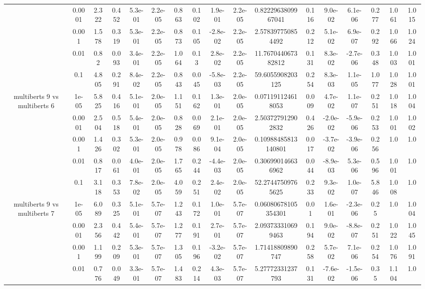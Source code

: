 \begin{tabular}{|c|c|c|c|c|c|c|c|c|c|c|c|c|c|c|c|c|}
 & 0.0001 & 2.322 & 0.452 & 5.3e-01 & 2.2e-05 & 0.863 & 0.102 & 1.9e-01 & 2.2e-05 & 0.8222963809967041 & 0.116 & 9.0e-02 & 6.1e-06 & 0.277 & 1.061 & 1.015 \\
 & 0.001 & 1.578 & 0.319 & 5.3e-01 & 2.2e-05 & 0.873 & 0.105 & -2.8e-02 & 2.2e-05 & 2.578397750854492 & 0.212 & 5.1e-02 & 6.9e-07 & 0.292 & 1.066 & 1.024 \\
 & 0.01 & 0.82 & 0.093 & 3.4e-01 & 2.2e-05 & 1.064 & 0.13 & 2.8e-02 & 2.2e-05 & 11.767044067382812 & 0.131 & 8.3e-02 & -2.7e-06 & 0.348 & 1.003 & 1.001 \\
 & 0.1 & 4.805 & 0.291 & 8.4e-02 & 2.2e-05 & 0.843 & 0.045 & -5.8e-03 & 2.2e-05 & 59.6055908203125 & 0.254 & 8.3e-03 & 1.1e-05 & 1.077 & 1.028 & 1.001 \\
\hline
\multirow{5}{*}{multiberts 9 vs multiberts 6} & 1e-05 & 5.825 & 0.416 & 5.1e-01 & 2.0e-05 & 1.151 & 0.162 & 1.3e-01 & 2.0e-05 & 0.071191124618053 & 0.009 & 4.7e-02 & 1.1e-07 & 0.251 & 1.018 & 1.004 \\
 & 0.0001 & 2.504 & 0.518 & 5.4e-01 & 2.0e-05 & 0.828 & 0.069 & 2.1e-01 & 2.0e-05 & 2.503727912902832 & 0.426 & -2.0e-02 & -5.9e-06 & 0.253 & 1.001 & 1.002 \\
 & 0.001 & 1.426 & 0.302 & 5.3e-01 & 2.0e-05 & 0.978 & 0.086 & 9.1e-04 & 2.0e-05 & 0.10988485813140801 & 0.017 & -3.7e-02 & -3.9e-06 & 0.256 & 1.0 & 1.0 \\
 & 0.01 & 0.817 & 0.061 & 4.0e-01 & 2.0e-05 & 1.765 & 0.244 & -4.4e-03 & 2.0e-05 & 0.306990146636962 & 0.044 & -8.9e-03 & 5.3e-06 & 0.596 & 1.001 & 1.0 \\
 & 0.1 & 3.118 & 0.353 & 7.8e-02 & 2.0e-05 & 4.059 & 0.251 & 2.4e-02 & 2.0e-05 & 52.27447509765625 & 0.233 & 9.3e-02 & 1.0e-07 & 5.846 & 1.008 & 1.0 \\
\hline
\multirow{5}{*}{multiberts 9 vs multiberts 7} & 1e-05 & 6.089 & 0.325 & 5.1e-01 & 5.7e-07 & 1.243 & 0.172 & 1.0e-01 & 5.7e-07 & 0.06080678105354301 & 0.01 & 1.6e-01 & -2.3e-06 & 0.25 & 1.0 & 1.004 \\
 & 0.0001 & 2.356 & 0.442 & 5.4e-01 & 5.7e-07 & 1.277 & 0.191 & 2.7e-01 & 5.7e-07 & 2.093733310699463 & 0.194 & 9.0e-02 & -8.8e-07 & 0.251 & 1.022 & 1.045 \\
 & 0.001 & 1.199 & 0.209 & 5.3e-01 & 5.7e-07 & 1.305 & 0.196 & -3.2e-02 & 5.7e-07 & 1.71418809890747 & 0.258 & 5.7e-02 & 7.1e-06 & 0.254 & 1.076 & 1.091 \\
 & 0.01 & 0.776 & 0.049 & 3.3e-01 & 5.7e-07 & 1.483 & 0.214 & 4.3e-03 & 5.7e-07 & 5.27772331237793 & 0.131 & -7.6e-02 & -1.5e-06 & 0.35 & 1.104 & 1.0 \\

\end{tabular}
